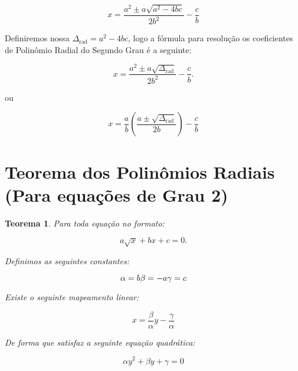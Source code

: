 \documentclass{article}
\newtheorem{theorem}{Teorema}
\begin{document}
\[
x = \frac{a^2 \pm a\sqrt{a^2-4bc}}{2b^2}- \frac{c}{b}
\]

Definiremos nossa $\Delta_{\text{rad}}= a^2-4bc$, logo a fórmula para resolução os coeficientes de Polinômio Radial do Segundo Grau é a seguinte:

\[
x = \frac{a^2 \pm a\sqrt{\Delta_{\text{rad}}}}{2b^2}- \frac{c}{b}.
\]

ou

\[
x = \frac{a}{b}\left(\frac{a \pm \sqrt{\Delta_{\text{rad}}}}{2b}\right)- \frac{c}{b}
\]

\section{Teorema dos Polinômios Radiais (Para equações de Grau 2)}

\begin{theorem}
Para toda equação no formato:

\[
a\sqrt{x} + bx + c = 0.
\]

Definimos as seguintes constantes:

\[
\alpha = b \\
\beta = -a \\
\gamma = c
\]

Existe o seguinte mapeamento linear:

\[
x=\frac{\beta}{\alpha}y-\frac{\gamma}{\alpha}
\]

De forma que satisfaz a seguinte equação quadrática:

\[
\alpha y^2 + \beta y + \gamma = 0 
\]
\end{theorem}
\end{document}
